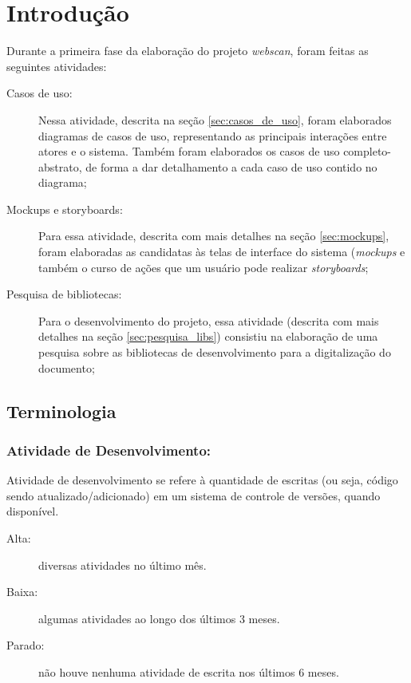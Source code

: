 \section{Introdução}
\label{sec:intro}

Durante a primeira fase da elaboração do projeto {\it webscan}, foram feitas as seguintes atividades:

\begin{description}
    \item[Casos de uso: ] Nessa atividade, descrita na seção \ref{sec:casos_de_uso}, foram elaborados diagramas de casos de uso, representando as principais interações entre atores e o sistema. Também foram elaborados os casos de uso completo-abstrato, de forma a dar detalhamento a cada caso de uso contido no diagrama;
    \item[Mockups e storyboards: ] Para essa atividade, descrita com mais detalhes na seção \ref{sec:mockups}, foram elaboradas as candidatas às telas de interface do sistema ({\it mockups} e também o curso de ações que um usuário pode realizar {\it storyboards};
    \item[Pesquisa de bibliotecas: ] Para o desenvolvimento do projeto, essa atividade (descrita com mais detalhes na seção \ref{sec:pesquisa_libs}) consistiu na elaboração de uma pesquisa sobre as bibliotecas de desenvolvimento para a digitalização do documento;
\end{description}

\subsection{Terminologia}

\subsubsection{Atividade de Desenvolvimento:}
Atividade de desenvolvimento se refere à quantidade de escritas (ou seja, código sendo atualizado/adicionado) em um sistema de controle de versões, quando disponível.

\begin{description}
    \item[Alta:] diversas atividades no último mês.
    \item[Baixa:] algumas atividades ao longo dos últimos 3 meses.
    \item[Parado:] não houve nenhuma atividade de escrita nos últimos 6 meses.
\end{description}

